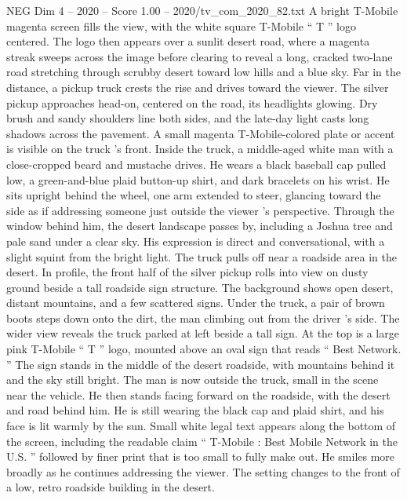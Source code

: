 \begin{textsample}{NEG Dim 4 – 2020 – Score 1.00 – 2020/tv\_com\_2020\_82.txt}  \label{ex:f4_neg_085}
A bright T-Mobile magenta screen fills the view, with the white square T-Mobile “ T ” logo centered.
The logo then appears over a sunlit desert road, where a magenta streak sweeps across the image before clearing to reveal a long, cracked two-lane road stretching through scrubby desert toward low hills and a blue sky.
Far in the distance, a pickup truck crests the rise and drives toward the viewer.
The silver pickup approaches head-on, centered on the road, its headlights glowing.
Dry brush and sandy shoulders line both sides, and the late-day light casts long shadows across the pavement.
A small magenta T-Mobile-colored plate or accent is visible on the truck ’s front.
Inside the truck, a middle-aged white man with a close-cropped beard and mustache drives.
He wears a black baseball cap pulled low, a green-and-blue plaid button-up shirt, and dark bracelets on his wrist.
He sits upright behind the wheel, one arm extended to steer, glancing toward the side as if addressing someone just outside the viewer ’s perspective.
Through the window behind him, the desert landscape passes by, including a Joshua tree and pale sand under a clear sky.
His expression is direct and conversational, with a slight squint from the bright light.
The truck pulls off near a roadside area in the desert.
In profile, the front half of the silver pickup rolls into view on dusty ground beside a tall roadside sign structure.
The background shows open desert, distant mountains, and a few scattered signs.
Under the truck, a pair of brown boots steps down onto the dirt, the man climbing out from the driver ’s side.
The wider view reveals the truck parked at left beside a tall sign.
At the top is a large pink T-Mobile “ T ” logo, mounted above an oval sign that reads “ Best Network. ” The sign stands in the middle of the desert roadside, with mountains behind it and the sky still bright.
The man is now outside the truck, small in the scene near the vehicle.
He then stands facing forward on the roadside, with the desert and road behind him.
He is still wearing the black cap and plaid shirt, and his face is lit warmly by the sun.
Small white legal text appears along the bottom of the screen, including the readable claim “ T-Mobile : Best Mobile Network in the U.S. ” followed by finer print that is too small to fully make out.
He smiles more broadly as he continues addressing the viewer.
The setting changes to the front of a low, retro roadside building in the desert.

\end{textsample}
